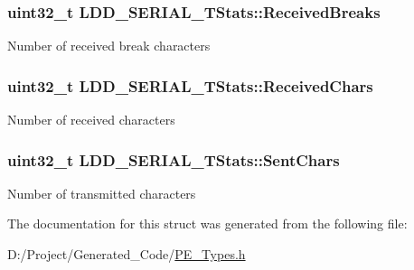 \subsubsection[{Received\+Breaks}]{\setlength{\rightskip}{0pt plus 5cm}uint32\+\_\+t L\+D\+D\+\_\+\+S\+E\+R\+I\+A\+L\+\_\+\+T\+Stats\+::\+Received\+Breaks}\label{struct_l_d_d___s_e_r_i_a_l___t_stats_a45f707461666b974a6c3b5c948e66cf7}
Number of received break characters \hypertarget{struct_l_d_d___s_e_r_i_a_l___t_stats_a7dd5faa8bc6c15fde011eb6192ca6168}{}
\subsubsection[{Received\+Chars}]{\setlength{\rightskip}{0pt plus 5cm}uint32\+\_\+t L\+D\+D\+\_\+\+S\+E\+R\+I\+A\+L\+\_\+\+T\+Stats\+::\+Received\+Chars}\label{struct_l_d_d___s_e_r_i_a_l___t_stats_a7dd5faa8bc6c15fde011eb6192ca6168}
Number of received characters \hypertarget{struct_l_d_d___s_e_r_i_a_l___t_stats_a60198f844b85f9e73efaca83e32471cd}{}
\subsubsection[{Sent\+Chars}]{\setlength{\rightskip}{0pt plus 5cm}uint32\+\_\+t L\+D\+D\+\_\+\+S\+E\+R\+I\+A\+L\+\_\+\+T\+Stats\+::\+Sent\+Chars}\label{struct_l_d_d___s_e_r_i_a_l___t_stats_a60198f844b85f9e73efaca83e32471cd}
Number of transmitted characters 

The documentation for this struct was generated from the following file\+:\begin{DoxyCompactItemize}
\item 
D\+:/\+Project/\+Generated\+\_\+\+Code/\hyperlink{_p_e___types_8h}{P\+E\+\_\+\+Types.\+h}\end{DoxyCompactItemize}
